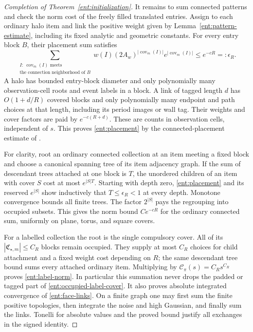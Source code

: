 \begin{proof}[Completion of Theorem~\ref{ent:initialization}]
It remains to sum connected patterns and check the norm cost
of the freely filled translated entries.  Assign to each
ordinary halo item and link the positive weight given by
Lemma~\ref{ent:pattern-estimate}, including its fixed
analytic and geometric constants.  For every entry block
\(B\), their placement sum satisfies
\begin{equation}\label{ent:placement}
 \sum_{\substack{I:\ \operatorname{cov}_m(I)\text{ meets}\\
                 \text{the connection neighborhood of }B}}
 w(I)(2A_w)^{|\operatorname{cov}_m(I)|}
              e^{|\operatorname{cov}_m(I)|}
                       \le e^{-cR}=:\epsilon_R .
\end{equation}
A halo has bounded entry-block diameter and only polynomially
many observation-cell roots and event labels in a block.
A link of tagged length \(d\) has
\(O(1+d/R)\) covered blocks and only polynomially many
endpoint and path choices at that length, including its
period images or wall tag.  Their weights and cover factors
are paid by \(e^{-c(R+d)}\).  These are counts in observation
cells, independent of \(s\).  This proves
\eqref{ent:placement} by the connected-placement estimate
of \cite[Equation~(9.34)]{B}.

For clarity, root an ordinary connected collection at an
item meeting a fixed block and choose a canonical spanning
tree of its item adjacency graph.  If the sum of descendant
trees attached at one block is \(T\), the unordered
children of an item with cover \(S\) cost at most
\(e^{|S|T}\).  Starting with depth zero,
\eqref{ent:placement} and its reserved \(e^{|S|}\)
show inductively that \(T\le\epsilon_R<1\) at every
depth.  Monotone convergence bounds all finite trees.
The factor \(2^{|S|}\) pays the regrouping into occupied
subsets.  This gives the norm bound \(Ce^{-cR}\)
for the ordinary connected sum, uniformly on plane,
torus, and square covers.

For a labelled collection the root is the single
compulsory cover.  All of its \(|\mathfrak C_{\star,m}|
\le C_R\) blocks remain occupied.  They supply at most
\(C_R\) choices for child attachment and a fixed
weight cost depending on \(R\); the same descendant
tree bound sums every attached ordinary item.  Multiplying
by \(\mathcal C_\pi(s)=C_Rs^{C_R}\) proves
\eqref{ent:label-norm}.  In particular this summation
never drops the padded or tagged part of
\eqref{ent:occupied-label-cover}.  It also proves absolute
integrated convergence of \eqref{ent:face-links}.  On a
finite graph one may first sum the finite positive
topologies, then integrate the noise and high Gaussian,
and finally sum the links.  Tonelli for absolute values
and the proved bound justify all exchanges in the signed
identity.


\end{proof}
